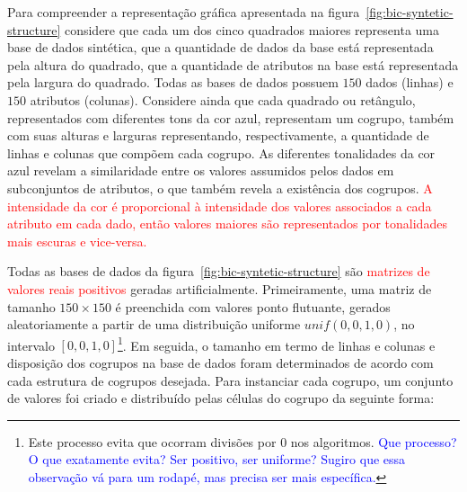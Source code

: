 \documentclass[
    12pt,                %
    oneside,            %
    a4paper,            %
    english,            %
    brazil                %
    ]{abntex2ppgsi}
\begin{document}
Para compreender a representação gráfica apresentada na figura~\ref{fig:bic-syntetic-structure} considere que cada um dos cinco quadrados maiores representa uma base de dados sintética, que a quantidade de dados da base está representada pela altura do quadrado, que a quantidade de atributos na base está representada pela largura do quadrado. Todas as bases de dados possuem $150$ dados (linhas) e $150$ atributos (colunas). Considere ainda que cada quadrado ou retângulo, representados com diferentes tons da cor azul, representam um cogrupo, também com suas alturas e larguras representando, respectivamente, a quantidade de linhas e colunas que compõem cada cogrupo. As diferentes tonalidades da cor azul revelam a similaridade entre os valores assumidos pelos dados em subconjuntos de atributos, o que também revela a existência dos cogrupos. \textcolor{red}{A intensidade da cor é proporcional à intensidade dos valores associados a cada atributo em cada dado, então valores maiores são representados por tonalidades mais escuras e vice-versa.}


Todas as bases de dados da figura~\ref{fig:bic-syntetic-structure} são \textcolor{red}{matrizes de valores reais positivos} geradas artificialmente. Primeiramente, uma matriz de tamanho $150 \times 150$ é preenchida com valores ponto flutuante, gerados aleatoriamente a partir de uma distribuição uniforme $unif(0,0, 1,0)$, no intervalo $[0,0, 1,0]$\footnote{Este processo evita que ocorram divisões por $0$ nos algoritmos. \textcolor{blue}{Que processo? O que exatamente evita? Ser positivo, ser uniforme? Sugiro que essa observação vá para um rodapé, mas precisa ser mais específica.}}. Em seguida, o tamanho em termo de linhas e colunas e disposição dos cogrupos na base de dados foram determinados de acordo com cada estrutura de cogrupos desejada. Para instanciar cada cogrupo, um conjunto de valores foi criado e distribuído pelas células do cogrupo da seguinte forma:


\end{document}
